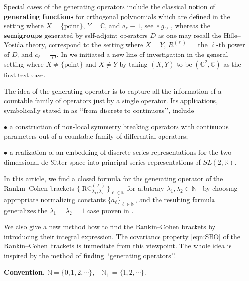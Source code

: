 \documentclass[12pt]{amsart}
\newcommand{\RC}{\operatorname{RC}}
\theoremstyle{plain} %
\theoremstyle{definition} %
\theoremstyle{remark} %
\begin{document}
Special cases of the generating operators  include 
 the classical notion
 of {\bf{generating functions}}
 for orthogonal polynomials 
 which are defined in the setting where $X=\{\text{point}\}$, 
  $Y={\mathbb{C}}$, and $a_{\ell} \equiv 1$, 
 see {\it{e.g., }} \cite{AAR}, 
 whereas the {\bf{semigroups}} generated 
 by self-adjoint operators $D$ 
 as one may recall the Hille--Yosida theory, 
 correspond to the setting 
 where $X=Y$, $R^{(\ell)}=$ the $\ell$-th power of $D$, 
 and $a_{\ell}=\frac 1 {\ell !}$.  
In \cite{K23, KPgen} 
 we initiated a new line of investigation
 in the general setting 
 where $X \ne \{\text{point}\}$ and $X \ne Y$
 by taking $(X,Y)$ to be $({\mathbb{C}}^2, {\mathbb{C}})$
 as the first test case.  



The idea of the generating operator is 
 to capture all the information 
 of a countable family 
 of operators
 just by a single operator.  
Its applications, 
 symbolically stated in \cite{K23} as
 \lq\lq{from discrete to continuous}\rq\rq,  
 include 

$\bullet$\enspace
 a construction 
 of non-local symmetry breaking operators
 with continuous parameters
 out of a countable family of differential operators;

$\bullet$\enspace
 a realization of an embedding 
 of discrete series representations for the two-dimensional de Sitter space
 into principal series representations of $SL(2,{\mathbb{R}})$.  



In this article, 
 we find a closed formula
 for the generating operator
 of the Rankin--Cohen brackets 
 $\{\RC_{\lambda_1, \lambda_2}^{(\ell)}\}_{\ell \in {\mathbb{N}}}$
 for arbitrary $\lambda_1, \lambda_2 \in {\mathbb{N}}_+$
 by choosing appropriate normalizing constants
 $\{a_{\ell}\}_{\ell \in {\mathbb{N}}}$, 
 and the resulting formula generalizes the $\lambda_1 = \lambda_2 =1$ case
 proven in \cite{KPgen}. 



We also give a new method how to find the Rankin--Cohen brackets
 by introducing their integral expression.  
The covariance property \eqref{eqn:SBO} of the Rankin--Cohen brackets
 is immediate from this viewpoint.  
The whole idea is inspired
 by the method of finding \lq\lq{generating operators}\rq\rq.  


\smallskip 
{\bf{Convention.}}\enspace
${\mathbb{N}}=\{0,1,2,\cdots\}$, \,\,
${\mathbb{N}}_+=\{1,2,\cdots\}$.  
\end{document}
